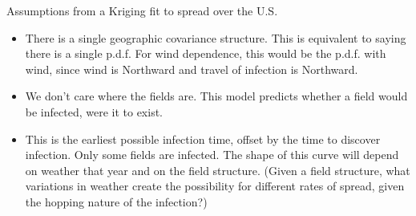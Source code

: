 \documentclass{article}
\begin{document}
Assumptions from a Kriging fit to spread over the U.S.
\begin{itemize}
\item There is a single geographic covariance structure. This is equivalent to saying there is a single p.d.f. For wind dependence, this would be the p.d.f. with wind, since wind is Northward and travel of infection is Northward.
\item We don't care where the fields are. This model predicts whether a field would be infected, were it to exist.
\item This is the earliest possible infection time, offset by the time to discover infection. Only some fields are infected. The shape of this curve will depend on weather that year and on the field structure. (Given a field structure, what variations in weather create the possibility for different rates of spread, given the hopping nature of the infection?)
\end{itemize}
\end{document}
